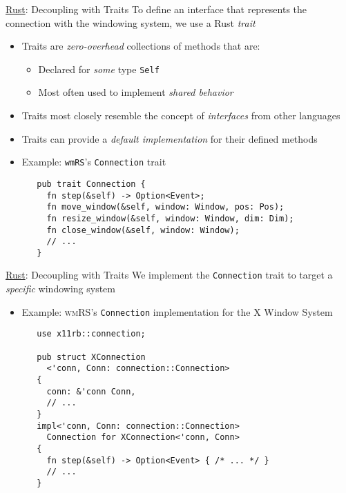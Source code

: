 \begin{frame}[c,fragile]{\underline{Rust}: Decoupling with Traits \hfill {\footnotesize \currentname}}
    To define an interface that represents the connection with the windowing system, we use a Rust \textit{trait}
    \begin{itemize}

        \item Traits are \textit{zero-overhead} collections of methods that are:\\
            \begin{itemize}
                \item Declared for \textit{some} type \texttt{Self}
                \item Most often used to implement \textit{shared behavior}
            \end{itemize}

        \item Traits most closely resemble the concept of \textit{interfaces} from other languages\\

        \item Traits can provide a \textit{default implementation} for their defined methods\\

        \item Example: \texttt{wmRS}'s \texttt{Connection} trait\\
\begin{verbatim}
   pub trait Connection {
     fn step(&self) -> Option<Event>;
     fn move_window(&self, window: Window, pos: Pos);
     fn resize_window(&self, window: Window, dim: Dim);
     fn close_window(&self, window: Window);
     // ...
   }
\end{verbatim}

    \end{itemize}

\end{frame}

\begin{frame}[c,fragile]{\underline{Rust}: Decoupling with Traits \hfill {\footnotesize \currentname}}
    We implement the \texttt{Connection} trait to target a \textit{specific} windowing system
    \begin{itemize}

        \item Example: \textsc{wmRS}'s \texttt{Connection} implementation for the X Window System\\
\begin{verbatim}
   use x11rb::connection;

   pub struct XConnection
     <'conn, Conn: connection::Connection>
   {
     conn: &'conn Conn,
     // ...
   }
   impl<'conn, Conn: connection::Connection>
     Connection for XConnection<'conn, Conn>
   {
     fn step(&self) -> Option<Event> { /* ... */ }
     // ...
   }
\end{verbatim}

    \end{itemize}

\end{frame}

